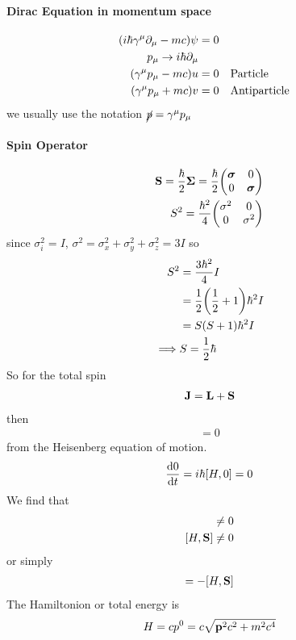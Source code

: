 \documentclass[../main.tex]{subfiles}
\begin{document}
\paragraph*{Dirac Equation in momentum space}
\begin{align*}
    (i\hbar \gamma^\mu \partial_\mu - mc) \psi &= 0 \\
    p_\mu \to i\hbar \partial_\mu \\
    (\gamma^\mu p_\mu - mc) u &= 0 \qqtext{Particle} \\
    (\gamma^\mu p_\mu + mc) v &= 0 \qqtext{Antiparticle}
\end{align*}
we usually use the notation $\cancel{p} = \gamma^\mu p_\mu$
\paragraph*{Spin Operator}
\begin{align*}
    \vb S = \frac{\hbar}{2} \vb*\Sigma = \frac{\hbar}{2} \mqty(\vb*\sigma & 0 \\ 0 & \vb*\sigma) \\
    S^2 = \frac{\hbar^2}{4} \mqty(\sigma^2 & 0 \\ 0 & \sigma^2)
\end{align*}
since $\sigma_i^2 = I$, $\sigma^2 = \sigma_x^2 + \sigma_y^2 + \sigma_z^2 = 3I$ so
\begin{align*}
    S^2 &= \frac{3\hbar^2}{4} I \\
    &= \frac{1}{2} \qt(\ohf + 1) \hbar^2 I \\
    &= S (S + 1) \hbar^2 I \\
    \implies & S = \ohf \hbar
\end{align*}
So for the total spin
\begin{align*}
    \vb J = \vb L + \vb S
\end{align*}
then 
\begin{align*}
    [H, \vb J] = 0
\end{align*}
from the Heisenberg equation of motion.
\begin{align*}
    \dv{0}{t} = i\hbar [H, 0] = 0
\end{align*}
We find that
\begin{align*}
    [H, \vb L] \neq 0 \\
    [H, \vb S] \neq 0
\end{align*}
or simply 
\begin{align*}
    [H, \vb L] = - [H, \vb S] 
\end{align*}
The Hamiltonion or total energy is
\begin{align*}
    H = c p^0 = c \sqrt{\vb p^2 c^2 + m^2 c^4}
\end{align*}
\end{document}
